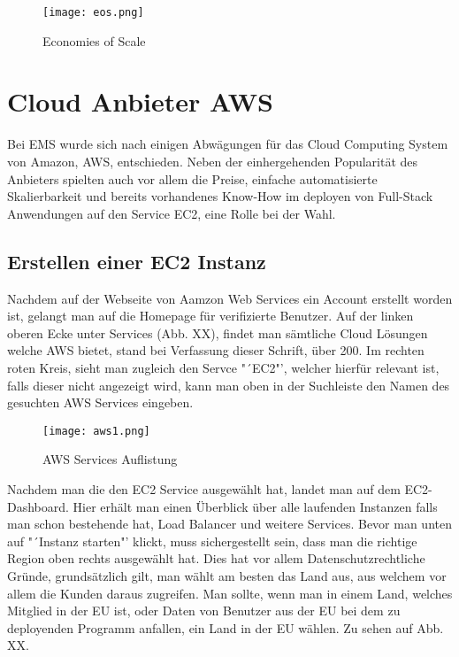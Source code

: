 \begin{center}
\begin{figure}[h]
    \centering
    \texttt{[image: eos.png]}
    \caption{Economies of Scale}
\end{figure}
\end{center}
\break

\section{Cloud Anbieter AWS}
Bei EMS wurde sich nach einigen Abwägungen für das Cloud Computing System von Amazon, AWS, entschieden. Neben der einhergehenden Popularität des Anbieters spielten auch vor allem die Preise, einfache automatisierte Skalierbarkeit und bereits vorhandenes Know-How im deployen von Full-Stack Anwendungen auf den Service EC2, eine Rolle bei der Wahl.

\subsection{Erstellen einer EC2 Instanz}
Nachdem auf der Webseite von Aamzon Web Services ein Account erstellt worden ist, gelangt man auf die Homepage für verifizierte Benutzer. Auf der linken oberen Ecke unter Services (Abb. XX), findet man sämtliche Cloud Lösungen welche AWS bietet, stand bei Verfassung dieser Schrift, über 200. Im rechten roten Kreis, sieht man zugleich den Servce "´EC2"', welcher hierfür relevant ist, falls dieser nicht angezeigt wird, kann man oben in der Suchleiste den Namen des gesuchten AWS Services eingeben.

\begin{center}
\begin{figure}[h]
    \centering
    \texttt{[image: aws1.png]}
    \caption{AWS Services Auflistung}
\end{figure}
\end{center}

Nachdem man die den EC2 Service ausgewählt hat, landet man auf dem EC2-Dashboard. Hier erhält man einen Überblick über alle laufenden Instanzen falls man schon bestehende hat, Load Balancer und weitere Services. Bevor man unten auf "´Instanz starten"' klickt, muss sichergestellt sein, dass man die richtige Region oben rechts ausgewählt hat. Dies hat vor allem Datenschutzrechtliche Gründe, grundsätzlich gilt, man wählt am besten das Land aus, aus welchem vor allem die Kunden daraus zugreifen. Man sollte, wenn man in einem Land, welches Mitglied in der EU ist, oder Daten von Benutzer aus der EU bei dem zu deployenden Programm anfallen, ein Land in der EU wählen. Zu sehen auf Abb. XX.

